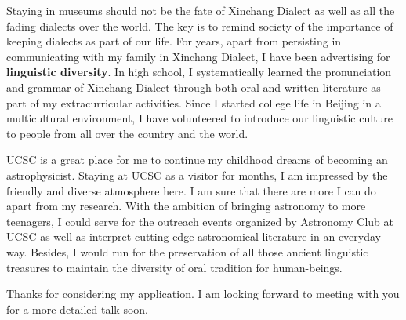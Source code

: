 \documentclass[11pt, a4paper]{awesome-cv} %
\begin{document}
\begin{cvletter}
Staying in museums should not be the fate of Xinchang Dialect as well as all the fading dialects over the world. The key is to remind society of the importance of keeping dialects as part of our life. For years, apart from persisting in communicating with my family in Xinchang Dialect, I have been advertising for \textbf{linguistic diversity}. In high school, I systematically learned the pronunciation and grammar of Xinchang Dialect through both oral and written literature as part of my extracurricular activities. Since I started college life in Beijing in a multicultural environment, I have volunteered to introduce our linguistic culture to people from all over the country and the world. 


UCSC is a great place for me to continue my childhood dreams of becoming an astrophysicist. Staying at UCSC as a visitor for months, I am impressed by the friendly and diverse atmosphere here. I am sure that there are more I can do apart from my research. With the ambition of bringing astronomy to more teenagers, I could serve for the outreach events organized by Astronomy Club at UCSC as well as interpret cutting-edge astronomical literature in an everyday way. Besides, I would run for the preservation of all those ancient linguistic treasures to maintain the diversity of oral tradition for human-beings.

Thanks for considering my application. I am looking forward to meeting with you for a more detailed talk soon.

\end{cvletter}


\end{document}
